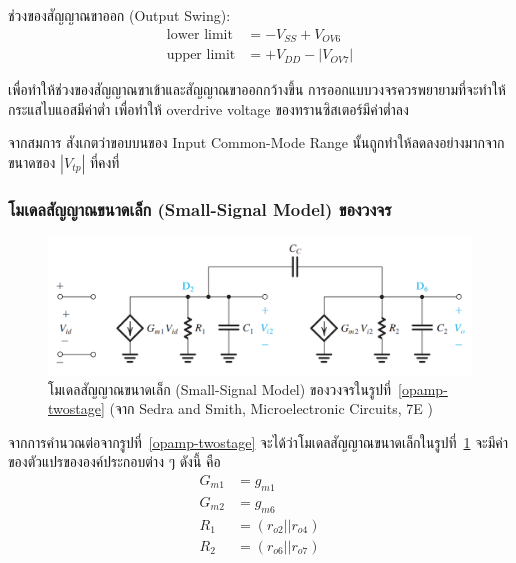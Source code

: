 \documentclass[a4paper, 11pt, oneside]{book} %
\begin{document}
ช่วงของสัญญาณขาออก (Output Swing):
\begin{subequations}
    \label{output-swing}
    \begin{align}
        \textrm{lower limit} &= -V_{SS} + V_{OV6} \\
        \textrm{upper limit} &= +V_{DD} - |V_{OV7}|
    \end{align}
\end{subequations}

เพื่อทำให้ช่วงของสัญญาณขาเข้าและสัญญาณขาออกกว้างขึ้น การออกแบบวงจรควรพยายามที่จะทำให้กระแสไบแอสมีค่าต่ำ เพื่อทำให้ overdrive voltage ของทรานซิสเตอร์มีค่าต่ำลง

จากสมการ สังเกตว่าขอบบนของ Input Common-Mode Range นั้นถูกทำให้ลดลงอย่างมากจากขนาดของ $|V_{tp}|$ ที่คงที่

\subsubsection{โมเดลสัญญาณขนาดเล็ก (Small-Signal Model) ของวงจร}

\begin{figure}[h]
    \centering
    \includegraphics[width=\linewidth]{opamp-twostage-smallsignal}
    \caption{โมเดลสัญญาณขนาดเล็ก (Small-Signal Model) ของวงจรในรูปที่~\ref{opamp-twostage} (จาก Sedra and Smith, Microelectronic Circuits, 7E \cite{Sedra15})}
    \label{opamp-twostage-smallsignal}
\end{figure}

จากการคำนวณต่อจากรูปที่~\ref{opamp-twostage} จะได้ว่าโมเดลสัญญาณขนาดเล็กในรูปที่~\ref{opamp-twostage-smallsignal} จะมีค่าของตัวแปรขององค์ประกอบต่าง ๆ ดังนี้ คือ 
\begin{subequations}
    \begin{align}
        G_{m1} &= g_{m1} \\
        G_{m2} &= g_{m6} \\
        R_1 &= (r_{o2}||r_{o4}) \\
        R_2 &= (r_{o6}||r_{o7})
    \end{align}
\end{subequations}
\end{document}
